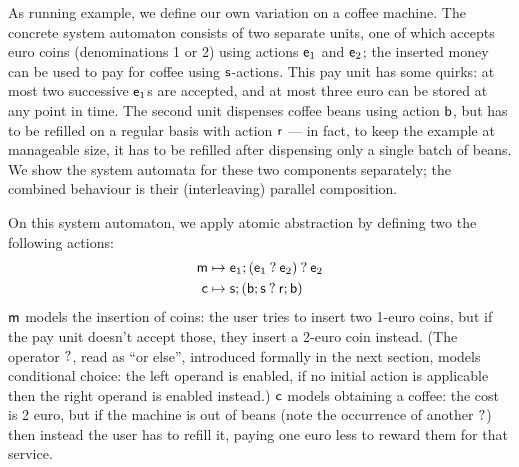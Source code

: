 As running example, we define our own variation on a coffee machine. The concrete system automaton consists of two separate units, one of which accepts euro coins (denominations 1 or 2) using actions $\mathsf{e}_1$ and $\mathsf{e}_2$; the inserted money can be used to pay for coffee using $\mathsf{s}$-actions. This pay unit has some quirks: at most two successive $\mathsf{e}_1$s are accepted, and at most three euro can be stored at any point in time. The second unit dispenses coffee beans using action $\mathsf{b}$, but has to be refilled on a regular basis with action $\mathsf{r}$ --- in fact, to keep the example at manageable size, it has to be refilled after dispensing only a single batch of beans. We show the system automata for these two components separately; the combined behaviour is their (interleaving) parallel composition.


On this system automaton, we apply atomic abstraction by defining two the following actions:
%
\begin{align*}
\mathsf{m} & \mapsto \mathsf{e}_1;(\mathsf{e}_1\mathbin{?} \mathsf{e}_2) \mathbin{?} \mathsf{e}_2 \\
\mathsf{c} & \mapsto \mathsf{s};(\mathsf{b};\mathsf{s} \mathbin{?} \mathsf{r};\mathsf{b}) 
\end{align*}
%
$\mathsf{m}$ models the insertion of coins: the user tries to insert two 1-euro coins, but if the pay unit doesn't accept those, they insert a 2-euro coin instead. (The operator $\mathbin{?}$, read as ``or else'', introduced formally in the next section, models conditional choice: the left operand is enabled, if no initial action is applicable then the right operand is enabled instead.) $\mathsf{c}$ models obtaining a coffee: the cost is 2 euro, but if the machine is out of beans (note the occurrence of another $\mathbin{?}$) then instead the user has to refill it, paying one euro less to reward them for that service.